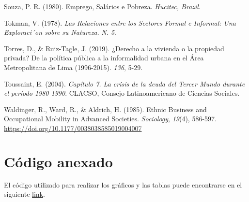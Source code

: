 \documentclass[
  letterpaper,
  12pt,
  oneside,
  spanish,
  doublespacing,
  headsepline,
  parskip]{MastersDoctoralThesis}
\newlength{\cslhangindent}
\newlength{\cslentryspacingunit} %
\newenvironment{CSLReferences}[2] %
 {%
  \setlength{\parindent}{0pt}
  \ifodd #1
  \let\oldpar\par
  \def\par{\hangindent=\cslhangindent\oldpar}
  \fi
  \setlength{\parskip}{#2\cslentryspacingunit}
 }%
 {}
\begin{document}
\begin{CSLReferences}{1}{0}
\leavevmode{}%
Souza, P. R. (1980). Emprego, Salários e Pobreza. \emph{Hucitec,
Brazil}.

\leavevmode{}%
Tokman, V. (1978). \emph{Las Relaciones entre los Sectores Formal e
Informal: Una Exploraci´on sobre su Natureza}. \emph{N. 5}.

\leavevmode{}%
Torres, D., \& Ruiz-Tagle, J. (2019). ¿Derecho a la vivienda o la
propiedad privada? De la política pública a la informalidad urbana en el
Área Metropolitana de Lima (1996-2015). \emph{136}, 5-29.

\leavevmode{}%
Toussaint, E. (2004). \emph{Capítulo 7. La crisis de la deuda del Tercer
Mundo durante el período 1980-1990}. CLACSO, Consejo Latinoamericano de
Ciencias Sociales.

\leavevmode{}%
Waldinger, R., Ward, R., \& Aldrich, H. (1985). Ethnic Business and
Occupational Mobility in Advanced Societies. \emph{Sociology},
\emph{19}(4), 586-597. \url{https://doi.org/10.1177/0038038585019004007}

\end{CSLReferences}

\appendix
{}

\hypertarget{sec-appA}{%
\chapter{Código anexado}\label{sec-appA}}

El código utilizado para realizar los gráficos y las tablas puede
encontrarse en el siguiente
\href{https://santiagosotelo.netlify.app/posts/03_tablas4_tesis/}{link}.
\end{document}
